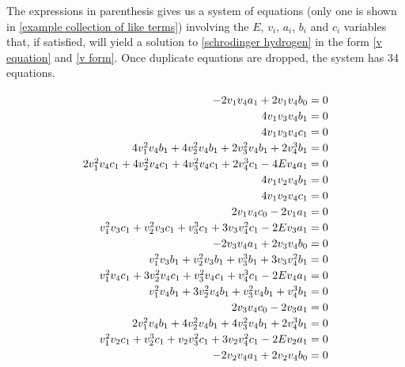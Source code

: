 \documentclass{article}
\begin{document}
The expressions in parenthesis gives us a system of equations (only one is shown in \eqref{example collection of like terms})
involving the $E$, $v_i$, $a_i$, $b_i$ and $c_i$ variables that, if satisfied,
will yield a solution to \eqref{schrodinger hydrogen} in the form \eqref{v equation} and \eqref{v form}.  Once
duplicate equations are dropped, the system has 34 equations.


\begin{equation}
\label{polynomial system}
{\renewcommand{\arraystretch}{1.2}
\begin{array}{r}
-2 v_{1} v_{4} a_{1} + 2 v_{1} v_{4} b_{0} = 0 \\
4 v_{1} v_{3} v_{4} b_{1} = 0 \\
4 v_{1} v_{3} v_{4} c_{1} = 0 \\
4 v_{1}^{2} v_{4} b_{1} + 4 v_{2}^{2} v_{4} b_{1} + 2 v_{3}^{2} v_{4} b_{1} + 2 v_{4}^{3} b_{1} = 0 \\
2 v_{1}^{2} v_{4} c_{1} + 4 v_{2}^{2} v_{4} c_{1} + 4 v_{3}^{2} v_{4} c_{1} + 2 v_{4}^{3} c_{1} - 4 E v_{4} a_{1} = 0 \\
4 v_{1} v_{2} v_{4} b_{1} = 0 \\
4 v_{1} v_{2} v_{4} c_{1} = 0 \\
2 v_{1} v_{4} c_{0} - 2 v_{1} a_{1} = 0 \\
v_{1}^{2} v_{3} c_{1} + v_{2}^{2} v_{3} c_{1} + v_{3}^{3} c_{1} + 3 v_{3} v_{4}^{2} c_{1} - 2 E v_{3} a_{1} = 0 \\
-2 v_{3} v_{4} a_{1} + 2 v_{3} v_{4} b_{0} = 0 \\
v_{1}^{2} v_{3} b_{1} + v_{2}^{2} v_{3} b_{1} + v_{3}^{3} b_{1} + 3 v_{3} v_{4}^{2} b_{1} = 0 \\
v_{1}^{2} v_{4} c_{1} + 3 v_{2}^{2} v_{4} c_{1} + v_{3}^{2} v_{4} c_{1} + v_{4}^{3} c_{1} - 2 E v_{4} a_{1} = 0 \\
v_{1}^{2} v_{4} b_{1} + 3 v_{2}^{2} v_{4} b_{1} + v_{3}^{2} v_{4} b_{1} + v_{4}^{3} b_{1} = 0 \\
2 v_{3} v_{4} c_{0} - 2 v_{3} a_{1} = 0 \\
2 v_{1}^{2} v_{4} b_{1} + 4 v_{2}^{2} v_{4} b_{1} + 4 v_{3}^{2} v_{4} b_{1} + 2 v_{4}^{3} b_{1} = 0 \\
v_{1}^{2} v_{2} c_{1} + v_{2}^{3} c_{1} + v_{2} v_{3}^{2} c_{1} + 3 v_{2} v_{4}^{2} c_{1} - 2 E v_{2} a_{1} = 0 \\
-2 v_{2} v_{4} a_{1} + 2 v_{2} v_{4} b_{0} = 0 \\

\end{array}}
\end{equation}
\end{document}
